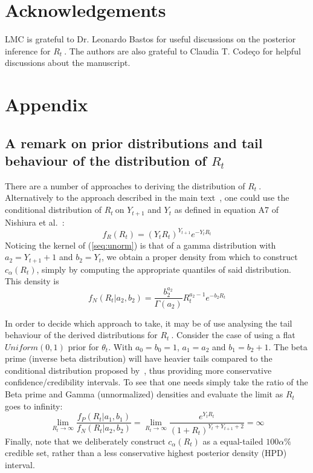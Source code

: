 \documentclass[10pt]{article}
\def \rr {$R_{t}\:$}
\begin{document}
\newpage
\section*{Acknowledgements}
LMC is grateful to Dr. Leonardo Bastos for useful discussions on the 
posterior inference for \rr.
The authors are also grateful to Claudia T. 
Code\c{c}o for helpful discussions about the manuscript.

\newpage


\section*{Appendix}
\subsection*{A remark on prior distributions and tail behaviour of the 
distribution of $R_t$}
\label{sec:tails}
There are a number of approaches to deriving the distribution of \rr.
Alternatively to the approach described in the main text~\citep{mantel}, one 
could use the conditional distribution of \rr on 
$Y_{t+1}$ and $Y_t$ as defined in equation A7 of Nishiura et 
al.~\citep{nishiura}:
\begin{equation}
\label{seq:unorm}
f_{R}(R_{t}) = (Y_tR_{t})^{Y_{t+1}} e^{-Y_tR_{t}}
\end{equation}
Noticing the kernel of (\ref{seq:unorm}) is that of a gamma distribution with 
$a_2 = Y_{t+1}+1$ and $b_2 = Y_t$, we obtain a proper density from which to 
construct $c_{\alpha}(R_t)$, simply by computing the appropriate quantiles of 
said distribution.
 This density is
\begin{equation}
\label{seq:densityNishiura}
f_N(R_t| a_2, b_2) =  \frac{b_2^{a_2}}{\Gamma(a_2)} R_t^{a_2-1} e^{-b_2 R_t}
\end{equation}

In order to decide which approach to take, it may be of use analysing the 
tail behaviour of the derived distributions for \rr. 
Consider the case of using a flat $Uniform(0, 1)$ prior for $\theta_t$.
With $a_0 = b_0 = 1$, $a_1 = a_2$ and $b_1 = b_2 + 1$.
The beta prime (inverse beta distribution) will have heavier tails compared to 
the conditional distribution proposed by~\citep{nishiura}, thus providing more 
conservative confidence/credibility intervals.
To see that one needs simply take the ratio of the Beta prime and Gamma 
(unnormalized) densities and evaluate the limit as $R_t$ goes to infinity:
\begin{equation}
 \label{seq:densityratio}
 \lim_{R_t\to\infty}\frac{f_P(R_t| a_1, b_1)}{f_N(R_t| a_2, b_2)} =  
\lim_{R_t\to\infty}\frac{e^{Y_{t}R_t}}{(1 +R_t)^{Y_{t} + Y_{t +1}+2}} = \infty
\end{equation}
Finally, note that we deliberately construct $c_{\alpha}(R_{t})$ as a 
equal-tailed $100\alpha\%$ credible set, rather than a less conservative 
highest posterior density (HPD) interval.
\end{document}
